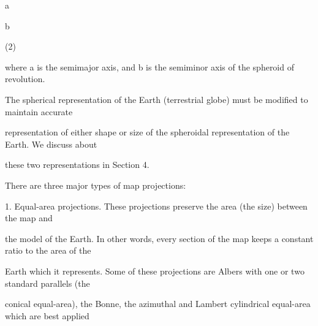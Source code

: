 \documentclass[a4paper,portrait,12pt]{article}
\begin{document}
\begin{flushleft}
a
\end{flushleft}


\begin{flushleft}
b
\end{flushleft}





(2)





\begin{flushleft}
where a is the semimajor axis, and b is the semiminor axis of the spheroid of revolution.
\end{flushleft}


\begin{flushleft}
The spherical representation of the Earth (terrestrial globe) must be modified to maintain accurate
\end{flushleft}


\begin{flushleft}
representation of either shape or size of the spheroidal representation of the Earth. We discuss about
\end{flushleft}


\begin{flushleft}
these two representations in Section 4.
\end{flushleft}


\begin{flushleft}
There are three major types of map projections:
\end{flushleft}


\begin{flushleft}
1. Equal-area projections. These projections preserve the area (the size) between the map and
\end{flushleft}


\begin{flushleft}
the model of the Earth. In other words, every section of the map keeps a constant ratio to the area of the
\end{flushleft}


\begin{flushleft}
Earth which it represents. Some of these projections are Albers with one or two standard parallels (the
\end{flushleft}


\begin{flushleft}
conical equal-area), the Bonne, the azimuthal and Lambert cylindrical equal-area which are best applied
\end{flushleft}
\end{document}
